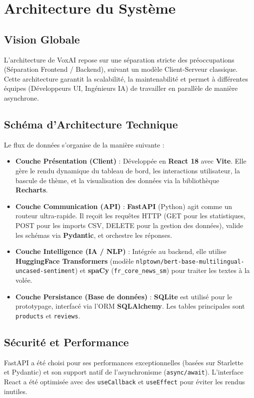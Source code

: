 \documentclass[12pt,a4paper]{article}
\begin{document}
\section{Architecture du Système}
\subsection{Vision Globale}
L'architecture de VoxAI repose sur une séparation stricte des préoccupations (Séparation Frontend / Backend), suivant un modèle Client-Serveur classique. Cette architecture garantit la scalabilité, la maintenabilité et permet à différentes équipes (Développeurs UI, Ingénieurs IA) de travailler en parallèle de manière asynchrone.

\subsection{Schéma d'Architecture Technique}
Le flux de données s'organise de la manière suivante :
\begin{itemize}
    \item \textbf{Couche Présentation (Client)} : Développée en \textbf{React 18} avec \textbf{Vite}. Elle gère le rendu dynamique du tableau de bord, les interactions utilisateur, la bascule de thème, et la visualisation des données via la bibliothèque \textbf{Recharts}.
    \item \textbf{Couche Communication (API)} : \textbf{FastAPI} (Python) agit comme un routeur ultra-rapide. Il reçoit les requêtes HTTP (GET pour les statistiques, POST pour les imports CSV, DELETE pour la gestion des données), valide les schémas via \textbf{Pydantic}, et orchestre les réponses.
    \item \textbf{Couche Intelligence (IA / NLP)} : Intégrée au backend, elle utilise \textbf{HuggingFace Transformers} (modèle \texttt{nlptown/bert-base-multilingual-uncased-sentiment}) et \textbf{spaCy} (\texttt{fr\_core\_news\_sm}) pour traiter les textes à la volée.
    \item \textbf{Couche Persistance (Base de données)} : \textbf{SQLite} est utilisé pour le prototypage, interfacé via l'ORM \textbf{SQLAlchemy}. Les tables principales sont \texttt{products} et \texttt{reviews}.
\end{itemize}

\subsection{Sécurité et Performance}
FastAPI a été choisi pour ses performances exceptionnelles (basées sur Starlette et Pydantic) et son support natif de l'asynchronisme (\texttt{async/await}). L'interface React a été optimisée avec des \texttt{useCallback} et \texttt{useEffect} pour éviter les rendus inutiles.
\newpage
\end{document}
